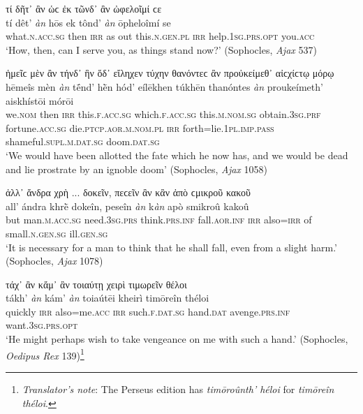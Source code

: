 \begin{exe}
\ex τί δῆτ᾽ ἂν ὡϲ ἐκ τῶνδ᾽ ἂν ὠφελοῖμί ϲε\\
\gll tí dêt' \emph{àn} hōs ek tônd' \emph{àn} ōpheloîmí se\\
what.\textsc{n.acc.sg} then \textsc{irr} as out this.\textsc{n.gen.pl} \textsc{irr} help.\textsc{1sg.prs.opt} you.\textsc{acc}\\
\trans `How, then, can I serve you, as things stand now?' (Sophocles, \textit{Ajax} 537)
\label{multian5}
\end{exe}

\begin{exe}
\ex ἡμεῖϲ μὲν ἂν τήνδ᾽ ἣν ὅδ᾽ εἴληχεν τύχην θανόντεϲ ἂν προὐκείμεθ᾽ αἰϲχίϲτῳ μόρῳ\\
\gll hēmeîs mèn \emph{àn} tḗnd' hḕn hód' eílēkhen túkhēn thanóntes \emph{àn} proukeímeth' aiskhístōi mórōi\\
we.\textsc{nom} then \textsc{irr} this.\textsc{f.acc.sg} which.\textsc{f.acc.sg} this.\textsc{m.nom.sg} obtain.\textsc{3sg.prf} fortune.\textsc{acc.sg} die.\textsc{ptcp.aor.m.nom.pl} \textsc{irr} forth=lie.\textsc{1pl.imp.pass} shameful.\textsc{supl.m.dat.sg} doom.\textsc{dat.sg}\\
\trans `We would have been allotted the fate which he now has, and we would be dead and lie prostrate by an ignoble doom' (Sophocles, \textit{Ajax} 1058)
\label{multian6}
\end{exe}

\begin{exe}
\ex ἀλλ᾽ ἄνδρα χρὴ ... δοκεῖν, πεϲεῖν ἂν κἂν ἀπὸ ϲμικροῦ κακοῦ\\
\gll all' ándra khrḕ dokeîn, peseîn \emph{àn} k\emph{àn} apò smikroû kakoû\\
but man.\textsc{m.acc.sg} need.\textsc{3sg.prs} think.\textsc{prs.inf} fall.\textsc{aor.inf} \textsc{irr} also=\textsc{irr} of small.\textsc{n.gen.sg} ill.\textsc{gen.sg}\\
\trans `It is necessary for a man to think that he shall fall, even from a slight harm.' (Sophocles, \textit{Ajax} 1078)
\label{multian7}
\end{exe}

\begin{exe}
\ex τάχ᾽ ἂν κἄμ᾽ ἂν τοιαύτῃ χειρὶ τιμωρεῖν θέλοι\\
\gll tákh' \emph{àn} kám' \emph{àn} toiaútēi kheirì timōreîn théloi\\
quickly \textsc{irr} also=me.\textsc{acc} \textsc{irr} such.\textsc{f.dat.sg} hand.\textsc{dat} avenge.\textsc{prs.inf} want.\textsc{3sg.prs.opt}\\
\trans `He might perhaps wish to take vengeance on me with such a hand.' (Sophocles, \textit{Oedipus Rex} 139)\footnote{\emph{Translator's note}: The Perseus edition has \textit{timōroûnth' héloi} for \textit{timōreîn théloi}.}
\label{multian8}
\end{exe}

